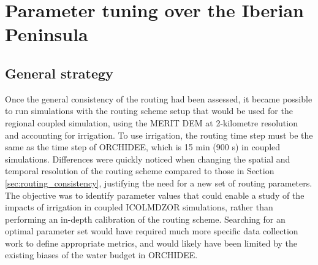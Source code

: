 \section{Parameter tuning over the Iberian Peninsula}
\label{section:calib}

\subsection{General strategy}

Once the general consistency of the \native routing had been assessed, it became possible to run simulations with the routing scheme setup that would be used for the regional coupled simulation, using the MERIT DEM at 2-kilometre resolution and accounting for irrigation. To use irrigation, the routing time step must be the same as the time step of ORCHIDEE, which is 15 min (900 s) in coupled simulations. 
Differences were quickly noticed when changing the spatial and temporal resolution of the routing scheme compared to those in Section \ref{sec:routing_consistency}, justifying the need for a new set of routing parameters. The objective was to identify parameter values that could enable a study of the impacts of irrigation in coupled ICOLMDZOR simulations, rather than performing an in-depth calibration of the routing scheme. Searching for an optimal parameter set would have required much more specific data collection work to define appropriate metrics, and would likely have been limited by the existing biases of the water budget in ORCHIDEE. 

